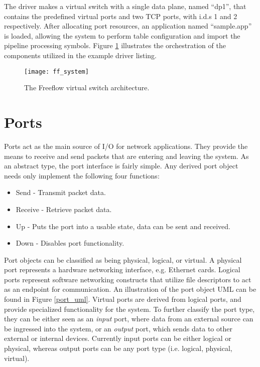 The driver makes a virtual switch with a single data plane, named ``dp1'', that
contains the predefined virtual ports and two TCP ports, with i.d.s 1 and 2
respectively. After allocating port resources, an application named
``sample.app'' is loaded, allowing the system to perform table configuration
and import the pipeline processing symbols. Figure \ref{ff_system} illustrates
the orchestration of the components utilized in the example driver listing.

\begin{figure}[h]
\centering
\texttt{[image: ff\_system]}
\caption{The Freeflow virtual switch architecture.}
\label{ff_system}
\end{figure}

\section{Ports}
\label{vm:port}
Ports act as the main source of I/O for network applications. They provide the
means to receive and send packets that are entering and leaving the system. As
an abstract type, the port interface is fairly simple. Any derived port object
needs only implement the following four functions:

\begin{itemize}
\item Send - Transmit packet data.
\item Receive - Retrieve packet data.
\item Up - Puts the port into a usable state, data can be sent and received.
\item Down - Disables port functionality.
\end{itemize}

Port objects can be classified as being physical, logical, or virtual. A
physical port represents a hardware networking interface, e.g. Ethernet cards.
Logical ports represent software networking constructs that utilize file
descriptors to act as an endpoint for communication. An illustration of the port
object UML can be found in Figure \ref{port_uml}. Virtual ports are derived
from logical ports, and provide specialized functionality for the system. To
further classify the port type, they can be either seen as an \emph{input}
port, where data from an external source can be ingressed into the system, or an
\emph{output} port, which sends data to other external or internal devices.
Currently input ports can be either logical or physical, whereas output ports
can be any port type (i.e. logical, physical, virtual).


